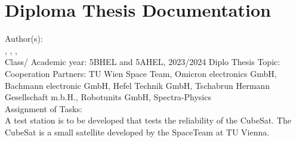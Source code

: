 
{\raggedright
\section{Diploma Thesis Documentation}
\vspace{3mm}
 Author(s):\\
 \nameSH, \nameJS, \nameCZ, \nameSB\\ 
\vspace{3mm}
 Class/ Academic year: 5BHEL and 5AHEL, 2023/2024
\vspace{3mm}
 Diplo Thesis Topic: \Thema\\
\vspace{3mm}
 Cooperation Partners: TU Wien Space Team\autocite{TU_Wien_Spaceteam}, Omicron electronics GmbH\autocite{OMICRON_electronics_GmbH}, Bachmann electronic GmbH\autocite{Bachmann_electronic_GmbH}, Hefel Technik GmbH\autocite{Hefel_Technik_GmbH}, Tschabrun Hermann Gesellschaft m.b.H.\autocite{Tschabrun_Hermann_Gesellschaft}, Robotunits GmbH\autocite{robogmbh}, Spectra-Physics \autocite{Spectra}\\
\vspace{3mm}
 Assignment of Tasks:\\
 A test station is to be developed that tests the reliability of the CubeSat. The CubeSat is a small satellite developed by the SpaceTeam at TU Vienna.\\    
}